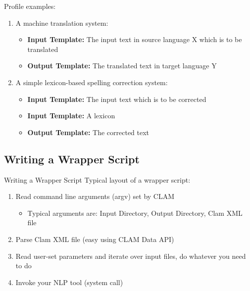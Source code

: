\documentclass[compress]{beamer}
\begin{document}
\begin{frame}
    \begin{example}
        Profile examples: 
        
        \begin{enumerate}
            \item A machine translation system:
            \begin{itemize}
                \item \textbf{Input Template: } The input text in source language X which is to be translated
                \item \textbf{Output Template: } The translated text in target language Y
            \end{itemize}    
            \item A simple lexicon-based spelling correction system:
            \begin{itemize}
                \item \textbf{Input Template: } The input text which is to be corrected
                \item \textbf{Input Template: } A lexicon
                \item \textbf{Output Template: } The corrected text
            \end{itemize}    
        \end{enumerate}
        
    \end{example}
\end{frame}

\subsection{Writing a Wrapper Script}

\begin{frame}
    \begin{block}{Writing a Wrapper Script}
        Typical layout of a wrapper script:
        \begin{enumerate}
            \item Read command line arguments (argv) set by CLAM
            \begin{itemize}
                \item Typical arguments are: Input Directory, Output Directory, Clam XML file            
            \end{itemize}
            \item Parse Clam XML file (easy using CLAM Data API)
            \item Read user-set parameters and iterate over input files, do whatever you need to do
            \item Invoke your NLP tool (system call)                
        \end{enumerate}
    \end{block}
\end{frame}        
\end{document}
